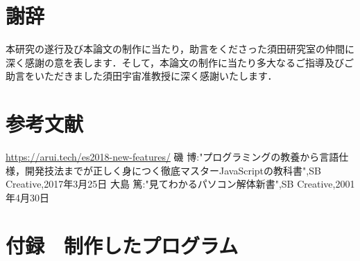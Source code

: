 \documentclass[a4j,12pt]{jsarticle}
\begin{document}
\section{謝辞}
本研究の遂行及び本論文の制作に当たり，助言をくださった須田研究室の仲間に深く感謝の意を表します．そして，本論文の制作に当たり多大なるご指導及びご助言をいただきました須田宇宙准教授に深く感謝いたします．
\newpage

\section{参考文献}
\begin{thebibliography}{99}
\url{https://arui.tech/es2018-new-features/}
磯 博:"プログラミングの教養から言語仕様，開発技法までが正しく身につく徹底マスターJavaScriptの教科書",SB Creative,2017年3月25日
大島 篤:"見てわかるパソコン解体新書",SB Creative,2001年4月30日
\end{thebibliography}
\newpage

\section{付録　制作したプログラム}
\end{document}
